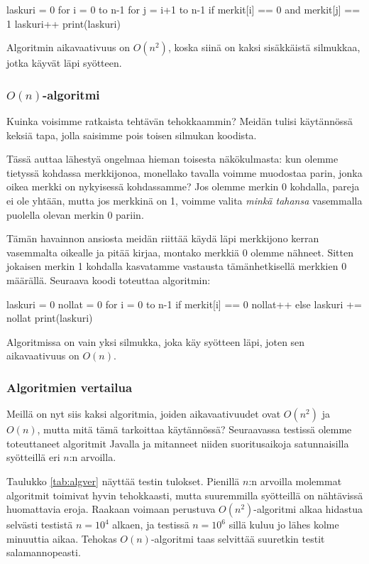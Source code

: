 \begin{code}
laskuri = 0
for i = 0 to n-1
    for j = i+1 to n-1
        if merkit[i] == 0 and merkit[j] == 1
            laskuri++
print(laskuri)
\end{code}

Algoritmin aikavaativuus on $O(n^2)$, koska siinä on kaksi
sisäkkäistä silmukkaa, jotka käyvät läpi syötteen.

\subsubsection{$O(n)$-algoritmi}

Kuinka voisimme ratkaista tehtävän tehokkaammin?
Meidän tulisi käytän\-nössä keksiä tapa, jolla saisimme
pois toisen silmukan koodista.

Tässä auttaa lähestyä ongelmaa hieman toisesta
näkökulmasta: kun olemme tietyssä kohdassa merkkijonoa,
monellako tavalla voimme muodostaa parin,
jonka oikea merkki on nykyisessä kohdassamme?
Jos olemme merkin 0 kohdalla, pareja ei ole yhtään,
mutta jos merkkinä on 1, voimme valita \emph{minkä tahansa}
vasemmalla puolella olevan merkin 0 pariin.

Tämän havainnon ansiosta meidän riittää käydä läpi
merkkijono kerran vasemmalta oikealle ja pitää kirjaa,
montako merkkiä 0 olemme nähneet.
Sitten jokaisen merkin 1 kohdalla kasvatamme
vastausta tämänhetkisellä merkkien 0 määrällä.
Seuraava koodi toteuttaa algoritmin:

\begin{code}
laskuri = 0
nollat = 0
for i = 0 to n-1
    if merkit[i] == 0
        nollat++
    else
        laskuri += nollat
print(laskuri)
\end{code}

Algoritmissa on vain yksi silmukka, joka käy syötteen läpi,
joten sen aikavaativuus on $O(n)$.

\subsubsection{Algoritmien vertailua}

Meillä on nyt siis kaksi algoritmia, joiden aikavaativuudet ovat
$O(n^2)$ ja $O(n)$, mutta mitä tämä tarkoittaa käytännössä?
Seuraavassa testissä olemme toteuttaneet algoritmit
Javalla ja mitanneet niiden suoritusaikoja
satunnaisilla syötteillä eri $n$:n arvoilla.

Taulukko \ref{tab:algver} näyttää testin tulokset.
Pienillä $n$:n arvoilla molemmat algoritmit toimivat
hyvin tehokkaasti, mutta suuremmilla syötteillä on
nähtävissä huomattavia eroja.
Raakaan voimaan perustuva $O(n^2)$-algoritmi
alkaa hidastua selvästi testistä $n=10^4$ alkaen,
ja testissä $n=10^6$ sillä kuluu jo lähes kolme minuuttia aikaa.
Tehokas $O(n)$-algoritmi taas selvittää suuretkin testit
salamannopeasti.

